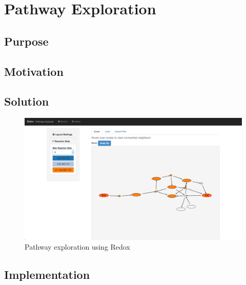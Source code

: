 \chapter{Pathway Exploration}

\section{Purpose}

\section{Motivation}

\section{Solution}

\begin{figure}
  \centering
  \includegraphics[width=\textwidth,natwidth=610,natheight=642]{images/redox-ui.png}
  \caption{Pathway exploration using Redox}
  \label{Figure:redox}
\end{figure}



\section{Implementation}
